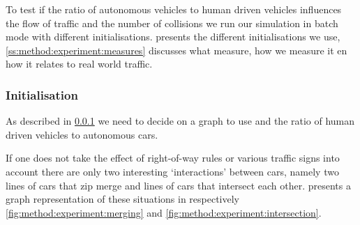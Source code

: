 To test if the ratio of autonomous vehicles to human driven vehicles influences the flow of traffic and the number of collisions we run our simulation in batch mode with different initialisations.  presents the different initialisations we use, \cref{ss:method:experiment:measures} discusses what measure, how we measure it en how it relates to real world traffic. 

\subsubsection{Initialisation}
\label{ss:method:experiment:init}
As described in \cref{ss:method:experiment:init} we need to decide on a graph to use and the ratio of human driven vehicles to autonomous cars. 

If one does not take the effect of right-of-way rules or various traffic signs into account there are only two interesting `interactions' between cars, namely two lines of cars that zip merge and lines of cars that intersect each other.  presents a graph representation of these situations in respectively \cref{fig:method:experiment:merging} and \cref{fig:method:experiment:intersection}.


